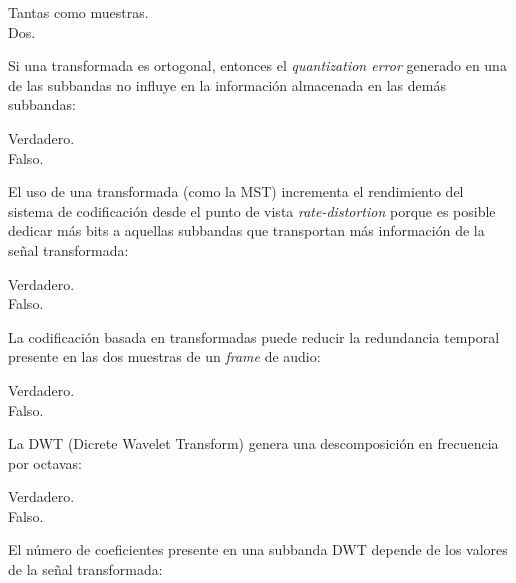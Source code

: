 \documentclass[legalpaper, 12pt, addpoints]{exam}
\begin{document}
\begin{questions}
\begin{oneparchoices}
  \choice Tantas como muestras.\\
  \choice Dos.
\end{oneparchoices}
  
\vspace{0.10in}

\question Si una transformada es ortogonal, entonces el
\emph{quantization error} generado en una de las subbandas no influye
en la información almacenada en las demás subbandas:

\begin{oneparchoices}
  \choice Verdadero.\\
  \choice Falso.
\end{oneparchoices}
  
\vspace{0.10in}

\question El uso de una transformada (como la MST) incrementa el
rendimiento del sistema de codificación desde el punto de vista
\emph{rate-distortion} porque es posible dedicar más bits a aquellas
subbandas que transportan más información de la señal transformada:

\begin{oneparchoices}
  \choice Verdadero.\\
  \choice Falso.
\end{oneparchoices}
  
\vspace{0.10in}

\question La codificación basada en transformadas puede reducir la
redundancia temporal presente en las dos muestras de un \emph{frame}
de audio:

\begin{oneparchoices}
  \choice Verdadero.\\
  \choice Falso.
\end{oneparchoices}
  
\vspace{0.10in}

\question La DWT (Dicrete Wavelet Transform) genera una descomposición
en frecuencia por octavas:

\begin{oneparchoices}
  \choice Verdadero.\\
  \choice Falso.
\end{oneparchoices}
  
\vspace{0.10in}

\question El número de coeficientes presente en una subbanda DWT
depende de los valores de la señal transformada:


\end{questions}
\end{document}
